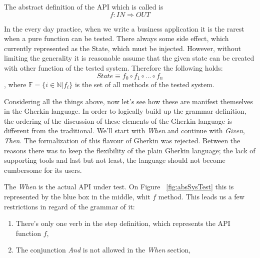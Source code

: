 \documentclass[conference]{IEEEtran}
\begin{document}
The abstract definition of the API which is called is 
\begin{equation} \label{eq:apiFn}
    f: IN \Rightarrow OUT
\end{equation}

In the every day practice, when we write a business application it is the rarest when a pure function can be tested. There always some side effect, which currently represented as the State, which must be injected. However, without limiting the generality it is reasonable assume that the given state can be created with other function of the tested system. Therefore the following holds:
\begin{equation} \label{eq:stateAsComposition}
    State \equiv f_{0} \circ f_{1} \circ ... \circ f_{n}
\end{equation}
, where \( \mathbb{F} = \{ i \in \mathbb{N} | f_{i} \} \) is the set of all methods of the tested system.

Considering all the things above, now let's see how these are manifest themselves in the Gherkin language. In order to logically build up the grammar definition, the ordering of the discussion of these elements of the Gherkin language is different from the traditional. We'll start with \textit{When} and continue with \textit{Given}, \textit{Then}. The formalization of this flavour of Gherkin was rejected. Between the reasons there was to keep the flexibility of the plain Gherkin language; the lack of supporting tools and last but not least, the language should not become cumbersome for its users.

The \textit{When} is the actual API under test. On Figure ~\ref{fig:absSysTest} this is represented by the blue box in the middle, whit \(f\) method. This leads us a few restrictions in regard of the grammar of it:
\begin{enumerate}[label=w.\arabic*]
    \item There's only one verb in the step definition, which represents the API function \(f\),
    \item The conjunction \textit{And} is not allowed in the \textit{When} section,
\end{enumerate}
\end{document}
